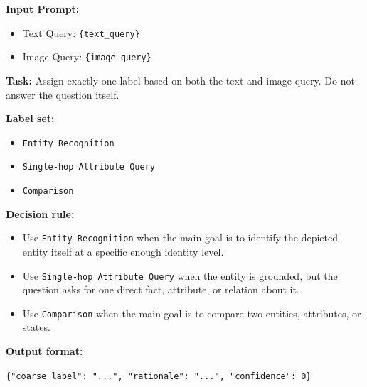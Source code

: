 \documentclass{article} %
\begin{document}
\begin{tcolorbox}[
  title=Example: InfoSeek Three-way Annotation Prompt,
  coltitle=black,
  colbacktitle=blue!8,
  colback=blue!5,
  colframe=black,
  fonttitle=\bfseries,
  arc=2mm,
  boxrule=0.5pt,
  enhanced jigsaw,
  breakable,
  width=\linewidth,
  left=6pt,
  right=6pt,
  top=6pt,
  bottom=6pt
]

\textbf{Input Prompt:}

\begin{itemize}
  \item Text Query: \texttt{\{text\_query\}}
  \item Image Query: \texttt{\{image\_query\}}
\end{itemize}

\textbf{Task:}
Assign exactly one label based on both the text and image query.
Do not answer the question itself.

\textbf{Label set:}
\begin{itemize}
  \item \texttt{Entity Recognition}
  \item \texttt{Single-hop Attribute Query}
  \item \texttt{Comparison}
\end{itemize}

\textbf{Decision rule:}
\begin{itemize}
  \item Use \texttt{Entity Recognition} when the main goal is to identify the depicted entity itself at a specific enough identity level.
  \item Use \texttt{Single-hop Attribute Query} when the entity is grounded, but the question asks for one direct fact, attribute, or relation about it.
  \item Use \texttt{Comparison} when the main goal is to compare two entities, attributes, or states.
\end{itemize}

\textbf{Output format:}

\verb|{"coarse_label": "...", "rationale": "...", "confidence": 0}|
\end{tcolorbox}
\end{document}
